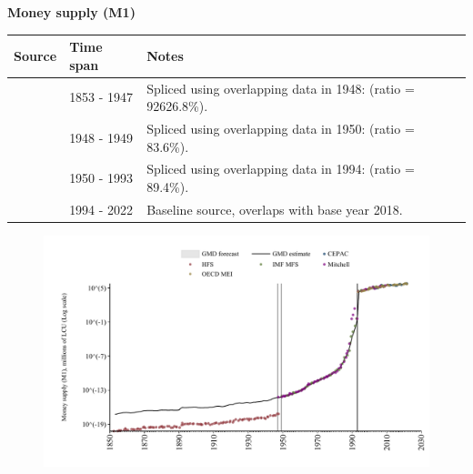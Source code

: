 \documentclass[12pt,a4paper,landscape]{article}
\begin{document}
\begin{adjustbox}{max totalsize={\paperwidth}{\paperheight},center}
\begin{minipage}[t][\textheight][t]{\textwidth}
\vspace*{0.5cm}
{}
\begin{center}
{\Large\bfseries Money supply (M1)}
\end{center}
\vspace{0.5cm}
\begin{table}[H]
\centering
\small
\begin{tabular}{|l|l|l|}
\hline
\textbf{Source} & \textbf{Time span} & \textbf{Notes} \\
\hline
\rowcolor{white}\cite{HFS}& 1853 - 1947 &Spliced using overlapping data in 1948: (ratio = 92626.8\%). \\
\rowcolor{lightgray}\cite{Mitchell}& 1948 - 1949 &Spliced using overlapping data in 1950: (ratio = 83.6\%). \\
\rowcolor{white}\cite{IMF_MFS}& 1950 - 1993 &Spliced using overlapping data in 1994: (ratio = 89.4\%). \\
\rowcolor{lightgray}\cite{OECD_MEI}& 1994 - 2022 &Baseline source, overlaps with base year 2018. \\
\hline
\end{tabular}
\end{table}
\begin{figure}[H]
\centering
\includegraphics[width=\textwidth,height=0.6\textheight,keepaspectratio]{graphs/BRA_M1.pdf}
\end{figure}
\end{minipage}
\end{adjustbox}
\end{document}
